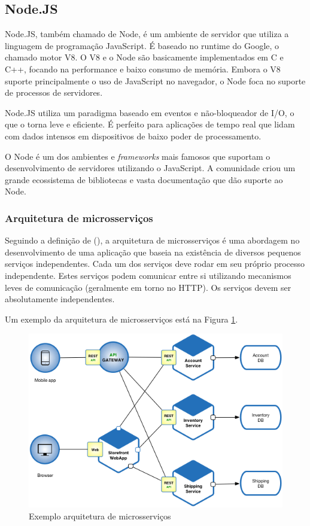 \subsection{Node.JS}

Node.JS, também chamado de Node, é um ambiente de servidor que utiliza a linguagem de programação JavaScript. É baseado no runtime do Google, o chamado motor V8. O V8 e o Node são basicamente implementados em C e C++, focando na performance e baixo consumo de memória. Embora o V8 suporte principalmente o uso de JavaScript no navegador, o Node foca no suporte de processos de servidores. \cite{Tilkov2010}

Node.JS utiliza um paradigma baseado em eventos e não-bloqueador de I/O, o que o torna leve e eficiente. É perfeito para aplicações de tempo real que lidam com dados intensos em dispositivos de baixo poder de processamento. \cite{Sapes2016}

O Node é um dos ambientes e \textit{frameworks} mais famosos que suportam o desenvolvimento de servidores utilizando o JavaScript. A comunidade criou um grande ecossistema de bibliotecas e vasta documentação que dão suporte ao Node. \cite{Tilkov2010}

\subsubsection{Arquitetura de microsserviços}

Seguindo a definição de \citeauthor{ms1} (\citeyear{ms1}), a arquitetura de microsserviços é uma abordagem no desenvolvimento de uma aplicação que baseia na existência de diversos pequenos serviços independentes. Cada um dos serviços deve rodar em seu próprio processo independente. Estes serviços podem comunicar entre si utilizando mecanismos leves de comunicação (geralmente em torno no HTTP). Os serviços devem ser absolutamente independentes.

Um exemplo da arquitetura de microsserviços está na Figura \ref{fig:arquitetura-microsservicos}.

\begin{figure}[htbp]
	\centering
	\includegraphics[width=1\linewidth]{figuras/Microservice_Architecture.png}
	\caption{Exemplo arquitetura de microsserviços}
	\label{fig:arquitetura-microsservicos}
\end{figure}

